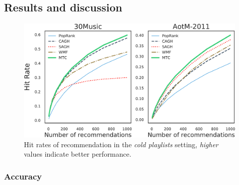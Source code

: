 \subsection{Results and discussion}



\begin{figure}[!t]
    \centering
    \includegraphics[width=\columnwidth]{fig/hr3.pdf}
    \caption{Hit rates of recommendation in the \emph{cold playlists} setting,
\emph{higher} values indicate better performance.}
    \label{fig:hr3}
\end{figure}


\subsubsection{Accuracy}

